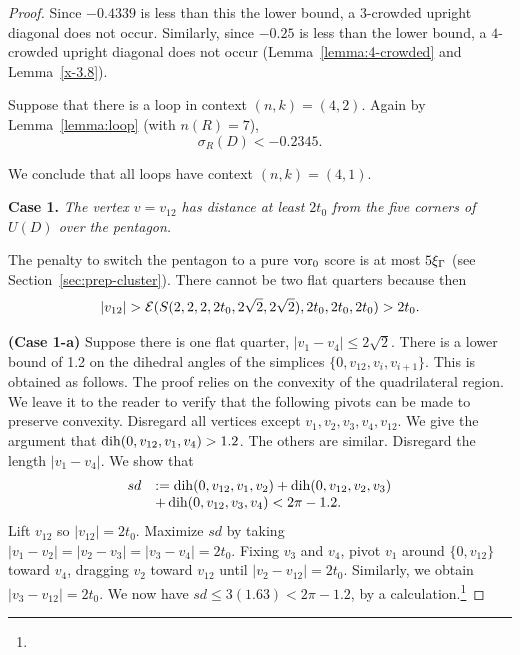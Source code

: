 \begin{proof}
Since $-0.4339$ is less than this the lower bound, a $3$-crowded
upright diagonal does not occur. Similarly, since $-0.25$ is less
than the lower bound, a $4$-crowded upright diagonal does not
occur (Lemma~\ref{lemma:4-crowded} and Lemma~\ref{x-3.8}).

Suppose that there is a loop in context $(n,k)=(4,2)$. Again by
Lemma~\ref{lemma:loop} (with $n(R)=7$),
$$\sigma_R(D)  < -0.2345.$$


We conclude that all loops have context $(n,k)=(4,1)$.


{\bf Case 1.}  {\it The vertex $v=v_{12}$ has distance at least
$2t_0$ from the five corners of $U(D)$ over the pentagon.}


The penalty to switch the pentagon to a pure $\operatorname{vor}_0$ score is at
most $5\xi_\Gamma$ (see Section~\ref{sec:prep-cluster}).  There cannot
be two flat quarters because then
$$|v_{12}|>\CalE(S(2,2,2,2t_0,2\sqrt2,2\sqrt2),2t_0,2t_0,2t_0)>2t_0.$$

{\bf (Case 1-a)} Suppose there is one flat quarter,
$|v_1-v_4|\le2\sqrt2$. There is a lower bound of 1.2 on the
dihedral angles of the simplices $\{0,v_{12},v_i,v_{i+1}\}$.  This
is obtained as follows.  The proof relies on the convexity of the
quadrilateral region.  We leave it to the reader to verify that
the following pivots can be made to preserve convexity.  Disregard
all vertices except $v_1,v_2,v_3,v_4,v_{12}$.  We give the
argument that $\operatorname{dih}(0,v_{12},v_1,v_4)>1.2$.  The others are
similar. Disregard the length $|v_1-v_4|$.  We show that
    $$
    \begin{array}{lll}
        sd &:=\operatorname{dih}(0,v_{12},v_1,v_2)+\operatorname{dih}(0,v_{12},v_2,v_3)\\
           &+\operatorname{dih}(0,v_{12},v_3,v_4) < 2\pi-1.2.
    \end{array}
    $$
Lift $v_{12}$ so $|v_{12}|=2t_0$. Maximize $sd$ by taking
$|v_1-v_2|=|v_2-v_3|=|v_3-v_4|=2t_0$.  Fixing $v_3$ and $v_4$,
pivot $v_1$ around $\{0,v_{12}\}$ toward $v_4$, dragging $v_2$
toward $v_{12}$ until $|v_2-v_{12}|=2t_0$.  Similarly, we obtain
$|v_3-v_{12}|=2t_0$. We now have $sd\le 3(1.63)< 2\pi-1.2$, by a
calculation.\footnote{}


\end{proof}
